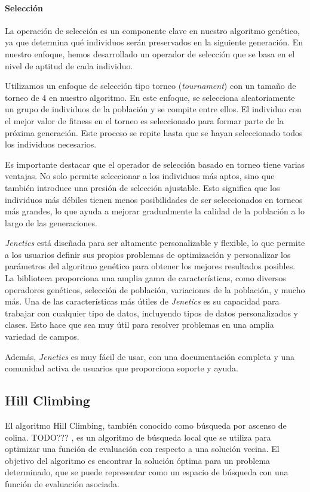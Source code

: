 \paragraph{Selección}
La operación de selección es un componente clave en nuestro algoritmo genético, ya que determina qué individuos serán preservados en la siguiente generación. En nuestro enfoque, hemos desarrollado un operador de selección que se basa en el nivel de aptitud de cada individuo.

Utilizamos un enfoque de selección tipo torneo (\emph{tournament}) con un tamaño de torneo de 4 en nuestro algoritmo. En este enfoque, se selecciona aleatoriamente un grupo de individuos de la población y se compite entre ellos. El individuo con el mejor valor de fitness en el torneo es seleccionado para formar parte de la próxima generación. Este proceso se repite hasta que se hayan seleccionado todos los individuos necesarios.

Es importante destacar que el operador de selección basado en torneo tiene varias ventajas. No solo permite seleccionar a los individuos más aptos, sino que también introduce una presión de selección ajustable. Esto significa que los individuos más débiles tienen menos posibilidades de ser seleccionados en torneos más grandes, lo que ayuda a mejorar gradualmente la calidad de la población a lo largo de las generaciones.


\emph{Jenetics} está diseñada para ser altamente personalizable y flexible, lo que permite a los usuarios definir sus propios problemas de optimización y personalizar los parámetros del algoritmo genético para obtener los mejores resultados posibles. La biblioteca proporciona una amplia gama de características, como diversos operadores genéticos, selección de población, variaciones de la población, y mucho más.
Una de las características más útiles de \emph{Jenetics} es su capacidad para trabajar con cualquier tipo de datos, incluyendo tipos de datos personalizados y clases. Esto hace que sea muy útil para resolver problemas en una amplia variedad de campos.

Además, \emph{Jenetics} es muy fácil de usar, con una documentación completa y una comunidad activa de usuarios que proporciona soporte y ayuda. 



\subsection{Hill Climbing}
\label{alg:approachHC}
El algoritmo Hill Climbing, también conocido como búsqueda por ascenso de colina. TODO??? , es un algoritmo de búsqueda local que se utiliza para optimizar una función de evaluación con respecto a una solución vecina. El objetivo del algoritmo es encontrar la solución óptima para un problema determinado, que se puede representar como un espacio de búsqueda con una función de evaluación asociada.

